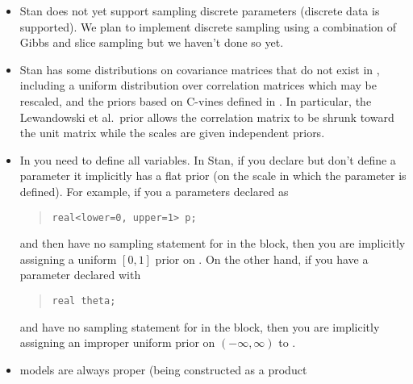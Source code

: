 \begin{itemize}
\item Stan does not yet support sampling discrete parameters (discrete
  data is supported).  We plan to implement discrete sampling using a
  combination of Gibbs and slice sampling but we haven't done so yet.
\item Stan has some distributions on covariance matrices that do not
  exist in \BUGS, including a uniform distribution over correlation
  matrices which may be rescaled, and the priors based on C-vines
  defined in \citep{LewandowskiKurowickaJoe:2009}.  In particular, the
  Lewandowski et al.\ prior allows the correlation matrix to be shrunk
  toward the unit matrix while the scales are given independent priors.
\item In \BUGS you need to define all variables.  In Stan, if you
  declare but don't define a parameter it implicitly has a flat prior
  (on the scale in which the parameter is defined).  For example, if
  you a parameters  declared as 
\begin{quote}
\begin{Verbatim}
real<lower=0, upper=1> p;
\end{Verbatim}
\end{quote}
%
and then have no sampling statement for  in the 
block, then you are implicitly assigning a uniform $[0,1]$ prior on
.
On the other hand, if you have a parameter  declared with
%
\begin{quote}
\begin{Verbatim}
real theta;
\end{Verbatim}
\end{quote}
%
and have no sampling statement for  in the
 block, 
 then you are implicitly assigning an improper uniform prior
on $(-\infty,\infty)$ to .  
%
\item \BUGS models are always proper (being constructed as a product

\end{itemize}
